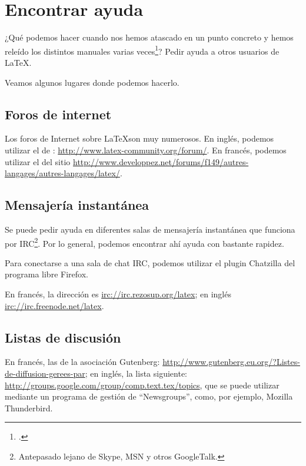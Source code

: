 \chapter{Encontrar ayuda}

\begin{intro}
¿Qué podemos hacer cuando nos hemos atascado en un punto concreto y hemos releído los distintos manuales varias veces\footcite[Señalemos, de paso, la posibilidad de descargar una ayuda sobre el conjunto de los errores de compilación con \LaTeX{}:][]{erreurscompilo}? Pedir ayuda a otros usuarios de \LaTeX{}.

Veamos algunos lugares donde podemos hacerlo.
\end{intro}


\section{Foros de internet}

Los foros de Internet sobre \LaTeX son muy numerosos. En inglés, podemos utilizar el de : \url{http://www.latex-community.org/forum/}. En francés, podemos utilizar el del sitio  \url{http://www.developpez.net/forums/f149/autres-langages/autres-langages/latex/}.


\section{Mensajería instantánea}

Se puede pedir ayuda en diferentes salas de mensajería instantánea que funciona por IRC\footnote{Antepasado lejano de Skype, MSN y otros GoogleTalk.}. Por lo general, podemos encontrar ahí ayuda con bastante rapidez.

Para conectarse a una sala de chat IRC, podemos utilizar el plugin Chatzilla del programa libre Firefox.

En francés, la dirección es \url{irc://irc.rezosup.org/latex}; en inglés
\url{irc://irc.freenode.net/latex}.


\section{Listas de discusión}

En francés, las de la asociación Gutenberg: \url{http://www.gutenberg.eu.org/?Listes-de-diffusion-gerees-par}; en inglés, la lista siguiente: \url{http://groups.google.com/group/comp.text.tex/topics}, que se puede utilizar mediante un programa de gestión de \enquote{Newsgroups}, como, por ejemplo, Mozilla Thunderbird.
